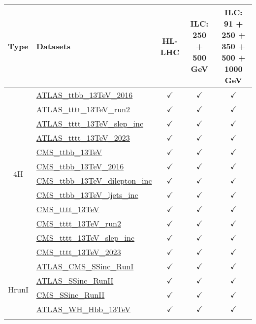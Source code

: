 \documentclass{article}
\begin{document}
\begin{longtable}{|c|l|c|c|c|}
\hline
\footnotesize
 Type & Datasets  & HL-LHC & ILC: 250 + 500 GeV & ILC: 91 + 250 + 350 + 500 + 1000 GeV \\ \hline
\multirow{12}{*}{4H}
 & \href{https://arxiv.org}{ATLAS_ttbb_13TeV_2016}  & $\checkmark$ & $\checkmark$ & $\checkmark$\\ \cline{2-5}
 & \href{https://arxiv.org}{ATLAS_tttt_13TeV_run2}  & $\checkmark$ & $\checkmark$ & $\checkmark$\\ \cline{2-5}
 & \href{https://arxiv.org}{ATLAS_tttt_13TeV_slep_inc}  & $\checkmark$ & $\checkmark$ & $\checkmark$\\ \cline{2-5}
 & \href{https://arxiv.org}{ATLAS_tttt_13TeV_2023}  & $\checkmark$ & $\checkmark$ & $\checkmark$\\ \cline{2-5}
 & \href{https://arxiv.org}{CMS_ttbb_13TeV}  & $\checkmark$ & $\checkmark$ & $\checkmark$\\ \cline{2-5}
 & \href{https://arxiv.org}{CMS_ttbb_13TeV_2016}  & $\checkmark$ & $\checkmark$ & $\checkmark$\\ \cline{2-5}
 & \href{https://arxiv.org}{CMS_ttbb_13TeV_dilepton_inc}  & $\checkmark$ & $\checkmark$ & $\checkmark$\\ \cline{2-5}
 & \href{https://arxiv.org}{CMS_ttbb_13TeV_ljets_inc}  & $\checkmark$ & $\checkmark$ & $\checkmark$\\ \cline{2-5}
 & \href{https://arxiv.org}{CMS_tttt_13TeV}  & $\checkmark$ & $\checkmark$ & $\checkmark$\\ \cline{2-5}
 & \href{https://arxiv.org}{CMS_tttt_13TeV_run2}  & $\checkmark$ & $\checkmark$ & $\checkmark$\\ \cline{2-5}
 & \href{https://arxiv.org}{CMS_tttt_13TeV_slep_inc}  & $\checkmark$ & $\checkmark$ & $\checkmark$\\ \cline{2-5}
 & \href{https://arxiv.org}{CMS_tttt_13TeV_2023}  & $\checkmark$ & $\checkmark$ & $\checkmark$
\\ \hline
\multirow{10}{*}{HrunI}
 & \href{https://arxiv.org}{ATLAS_CMS_SSinc_RunI}  & $\checkmark$ & $\checkmark$ & $\checkmark$\\ \cline{2-5}
 & \href{https://arxiv.org}{ATLAS_SSinc_RunII}  & $\checkmark$ & $\checkmark$ & $\checkmark$\\ \cline{2-5}
 & \href{https://arxiv.org}{CMS_SSinc_RunII}  & $\checkmark$ & $\checkmark$ & $\checkmark$\\ \cline{2-5}
 & \href{https://arxiv.org}{ATLAS_WH_Hbb_13TeV}  & $\checkmark$ & $\checkmark$ & $\checkmark$\\ \cline{2-5}

\end{longtable}
\end{document}
